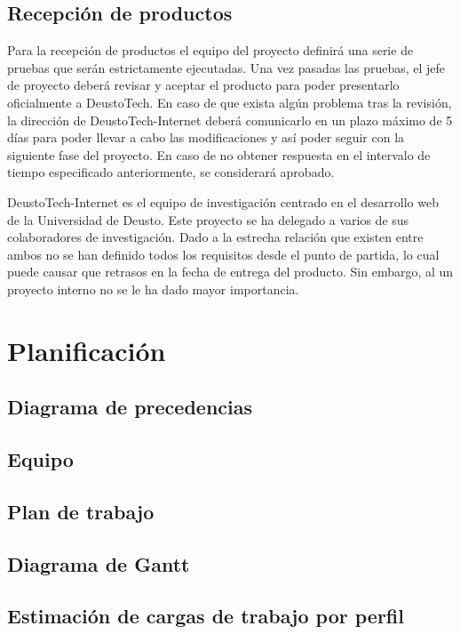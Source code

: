 \section{Recepción de productos}

Para la recepción de productos el equipo del proyecto definirá una serie de pruebas que serán estrictamente ejecutadas. Una vez pasadas las pruebas, el jefe de proyecto deberá revisar y aceptar el producto para poder presentarlo oficialmente a DeustoTech.  En caso de que exista algún problema tras la revisión,  la dirección de DeustoTech-Internet deberá comunicarlo en un plazo máximo de 5 días para poder llevar a cabo las modificaciones y así poder seguir con la siguiente fase del proyecto. En caso de no obtener respuesta en el intervalo de tiempo especificado anteriormente, se considerará aprobado.

DeustoTech-Internet es el equipo de investigación centrado en el desarrollo web de la Universidad de Deusto. Este proyecto se ha delegado a varios de sus colaboradores de investigación. Dado a la estrecha relación que existen entre ambos no se han definido todos los requisitos desde el punto de partida, lo cual puede causar que retrasos en la fecha de entrega del producto. Sin embargo, al un proyecto interno no se le ha dado mayor importancia.

\chapter{Planificación}

\section{Diagrama de precedencias}

\section{Equipo}

\section{Plan de trabajo}

\section{Diagrama de Gantt}

\section{Estimación de cargas de trabajo por perfil}

